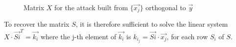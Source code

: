 \documentclass[9pt]{extarticle}
\begin{document}
\begin{figure}[H]
\centering
{}
\caption{Matrix $X$ for the attack built from $\{\vec{x_j}\}$ orthogonal to $\vec{y}$}
\end{figure}


To recover the matrix $S$, it is therefore sufficient to solve the linear system $X \cdot \vec{Si}^T = \vec{k_i}$ where the j-th element of $\vec{k_i}$ is $k_{i_j} = \vec{Si} \cdot \vec{x_j}$, for each row $S_i$ of $S$.
\end{document}
